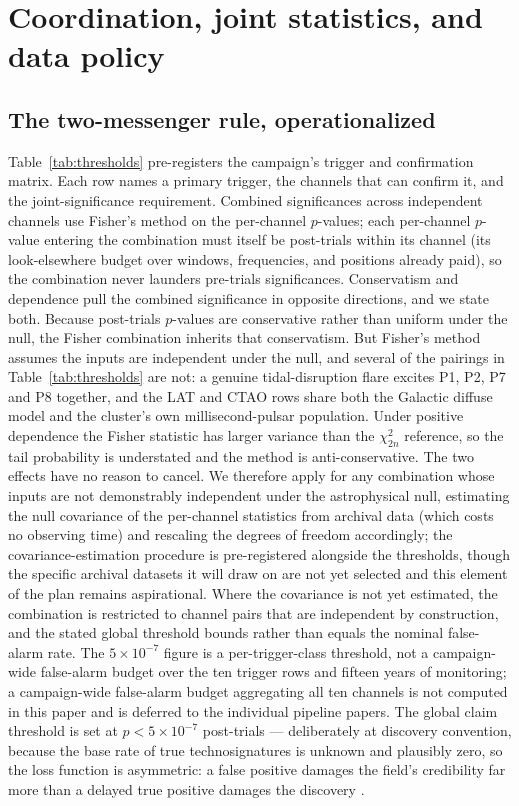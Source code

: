 \documentclass[11pt]{article}
\begin{document}
\section{Coordination, joint statistics, and data policy}
\label{sec:coordination}

\subsection{The two-messenger rule, operationalized}

Table~\ref{tab:thresholds} pre-registers the campaign's trigger and confirmation matrix. Each row names a primary trigger, the channels that can confirm it, and the joint-significance requirement. Combined significances across independent channels use Fisher's method on the per-channel $p$-values; each per-channel $p$-value entering the combination must itself be post-trials within its channel (its look-elsewhere budget over windows, frequencies, and positions already paid), so the combination never launders pre-trials significances. Conservatism and dependence pull the combined significance in opposite directions, and we state both. Because post-trials $p$-values are conservative rather than uniform under the null, the Fisher combination inherits that conservatism. But Fisher's method assumes the inputs are independent under the null, and several of the pairings in Table~\ref{tab:thresholds} are not: a genuine tidal-disruption flare excites P1, P2, P7 and P8 together, and the LAT and CTAO rows share both the Galactic diffuse model and the cluster's own millisecond-pulsar population. Under positive dependence the Fisher statistic has larger variance than the $\chi^{2}_{2n}$ reference, so the tail probability is understated and the method is anti-conservative. The two effects have no reason to cancel. We therefore apply \citet{Brown1975} for any combination whose inputs are not demonstrably independent under the astrophysical null, estimating the null covariance of the per-channel statistics from archival data (which costs no observing time) and rescaling the degrees of freedom accordingly; the covariance-estimation procedure is pre-registered alongside the thresholds, though the specific archival datasets it will draw on are not yet selected and this element of the plan remains aspirational. Where the covariance is not yet estimated, the combination is restricted to channel pairs that are independent by construction, and the stated global threshold bounds rather than equals the nominal false-alarm rate. The $5\times10^{-7}$ figure is a per-trigger-class threshold, not a campaign-wide false-alarm budget over the ten trigger rows and fifteen years of monitoring; a campaign-wide false-alarm budget aggregating all ten channels is not computed in this paper and is deferred to the individual pipeline papers. The global claim threshold is set at $p < 5\times10^{-7}$ post-trials --- deliberately at discovery convention, because the base rate of true technosignatures is unknown and plausibly zero, so the loss function is asymmetric: a false positive damages the field's credibility far more than a delayed true positive damages the discovery \citep{Wright2022}.
\end{document}
